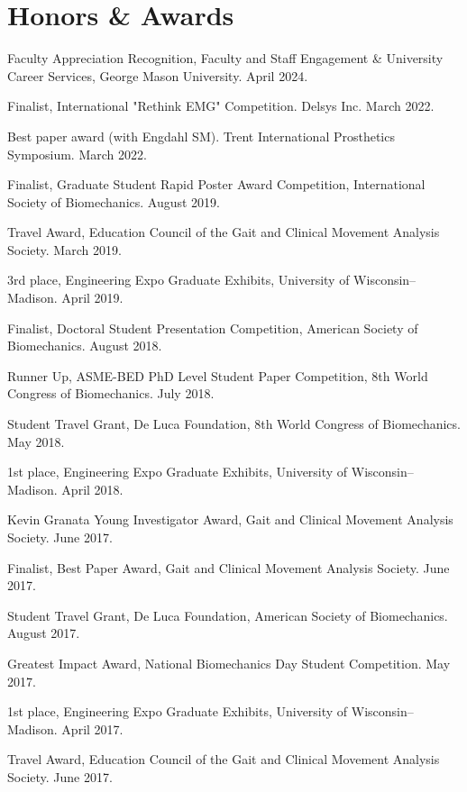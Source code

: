 \documentclass[letterpaper, 10pt]{article}
\begin{document}
\section{Honors \& Awards}

\begin{compactitem}
     \item Faculty Appreciation Recognition, Faculty and Staff Engagement \& University Career Services, George Mason University. April 2024.
     \item Finalist, International "Rethink EMG" Competition. Delsys Inc. March 2022.
	\item Best paper award (with Engdahl SM). Trent International Prosthetics Symposium. March 2022.
	\item Finalist, Graduate Student Rapid Poster Award Competition, International Society of Biomechanics. August 2019.
	\item Travel Award, Education Council of the Gait and Clinical Movement Analysis Society. March 2019.
	\item 3rd place, Engineering Expo Graduate Exhibits, University of Wisconsin--Madison. April 2019.
	\item Finalist, Doctoral Student Presentation Competition, American Society of Biomechanics. August 2018.
	\item Runner Up, ASME-BED PhD Level Student Paper Competition, 8th World Congress of Biomechanics. July 2018.
	\item Student Travel Grant, De Luca Foundation, 8th World Congress of Biomechanics. May 2018.
	\item 1st place, Engineering Expo Graduate Exhibits, University of Wisconsin--Madison. April 2018.
	\item Kevin Granata Young Investigator Award, Gait and Clinical Movement Analysis Society. June 2017.
	\item Finalist, Best Paper Award, Gait and Clinical Movement Analysis Society. June 2017.
	\item Student Travel Grant, De Luca Foundation, American Society of Biomechanics. August 2017.
	\item Greatest Impact Award, National Biomechanics Day Student Competition. May 2017.
	\item 1st place, Engineering Expo Graduate Exhibits, University of Wisconsin--Madison. April 2017.
	\item Travel Award, Education Council of the Gait and Clinical Movement Analysis Society. June 2017.

\end{compactitem}
\end{document}
